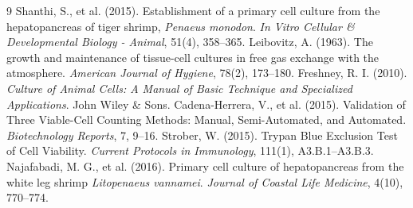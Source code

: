\documentclass[a4paper]{article}
\begin{document}
\begin{thebibliography}{9}
 Shanthi, S., et al. (2015). Establishment of a primary cell culture from the hepatopancreas of tiger shrimp, \emph{Penaeus monodon}. \emph{In Vitro Cellular \& Developmental Biology - Animal}, 51(4), 358--365.
 Leibovitz, A. (1963). The growth and maintenance of tissue-cell cultures in free gas exchange with the atmosphere. \emph{American Journal of Hygiene}, 78(2), 173--180.
 Freshney, R. I. (2010). \emph{Culture of Animal Cells: A Manual of Basic Technique and Specialized Applications}. John Wiley \& Sons.
 Cadena-Herrera, V., et al. (2015). Validation of Three Viable-Cell Counting Methods: Manual, Semi-Automated, and Automated. \emph{Biotechnology Reports}, 7, 9--16.
 Strober, W. (2015). Trypan Blue Exclusion Test of Cell Viability. \emph{Current Protocols in Immunology}, 111(1), A3.B.1--A3.B.3.
 Najafabadi, M. G., et al. (2016). Primary cell culture of hepatopancreas from the white leg shrimp \emph{Litopenaeus vannamei}. \emph{Journal of Coastal Life Medicine}, 4(10), 770--774.
\end{thebibliography}
\end{document}
